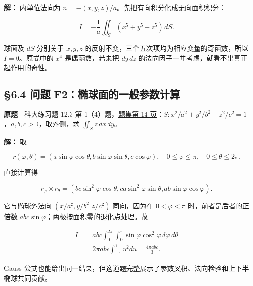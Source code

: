 \documentclass[11pt,a4paper]{article}
\begin{document}
\textbf{解：} 内单位法向为
\(n=-(x,y,z)/a\)。先把有向积分化成无向面积积分：

\begin{equation*}
 I=-\frac1a\iint_S(x^5+y^5+z^5)\,dS.
\end{equation*}

球面及 \(dS\) 分别关于 \(x,y,z\)
的反射不变，三个五次项均为相应变量的奇函数，所以 \(I=0\)。原式中的
\(x^4\) 是偶函数，若未把 \(dy\,dz\)
的法向因子一并考虑，就看不出真正起作用的奇性。

\subsection{§6.4 问题
F2：椭球面的一般参数计算}\label{ux95eeux9898-f2ux692dux7403ux9762ux7684ux4e00ux822cux53c2ux6570ux8ba1ux7b97}

\textbf{原题}　科大练习题 12.3 第
1（4）题，\href{https://zj139.github.io/math-notes/files/problems/科大数分习题-v2\%282\%29.pdf\#page=14}{题集第
14 页}：\(S:x^2/a^2+y^2/b^2+z^2/c^2=1\)，\(a,b,c>0\)，取外侧，求
\(\iint_Sz\,dx\,dy\)。

\textbf{解：} 取

\begin{equation*}
 r(\varphi,\theta)=(a\sin\varphi\cos\theta,b\sin\varphi\sin\theta,c\cos\varphi),
 \quad0\le\varphi\le\pi,\quad0\le\theta\le2\pi.
\end{equation*}

直接计算得

\begin{equation*}
 r_\varphi\times r_\theta=
 (bc\sin^2\varphi\cos\theta,ca\sin^2\varphi\sin\theta,
 ab\sin\varphi\cos\varphi).
\end{equation*}

它与椭球外法向 \((x/a^2,y/b^2,z/c^2)\) 同向，因为在 \(0<\varphi<\pi\)
时，前者是后者的正倍数 \(abc\sin\varphi\)；两极按面积零的退化点处理。故

\begin{equation*}
\begin{aligned}
 I&=abc\int_0^{2\pi}\!\int_0^\pi
 \sin\varphi\cos^2\varphi\,d\varphi\,d\theta\\
 &=2\pi abc\int_{-1}^1u^2du=\frac{4\pi abc}{3}.
\end{aligned}
\end{equation*}

Gauss
公式也能给出同一结果，但这道题完整展示了参数叉积、法向检验和上下半椭球共同贡献。
\end{document}
